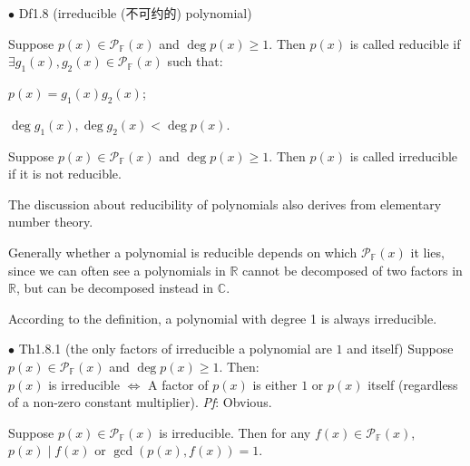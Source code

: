 \documentclass{article}
\begin{document}
\begin{Df}{$\bullet$ Df1.8 (irreducible (不可约的) polynomial)}
    \begin{compactitem}
        \item Suppose $p(x)\in\mathcal{P}_\mathbb{F}(x)$ and $\deg p(x)\geq 1$. Then $p(x)$ is called reducible if $\exists g_1(x), g_2(x)\in\mathcal{P}_\mathbb{F}(x)$ such that:
        \begin{compactenum}
            \item $p(x) = g_1(x)g_2(x)$;
            \item $\deg g_1(x), \deg g_2(x) < \deg p(x)$.
        \end{compactenum}
        \item Suppose $p(x)\in\mathcal{P}_\mathbb{F}(x)$ and $\deg p(x)\geq 1$. Then $p(x)$ is called irreducible if it is not reducible.
    \end{compactitem}
\end{Df}

\begin{Rmk}{}
    \begin{compactenum}
        \item The discussion about reducibility of polynomials also derives from elementary number theory.
        \item Generally whether a polynomial is reducible depends on which $\mathcal{P}_\mathbb{F}(x)$ it lies, since we can often see a polynomials in $\mathbb{R}$ cannot be decomposed of two factors in $\mathbb{R}$, but can be decomposed instead in $\mathbb{C}$.
        \item \textcolor{Th}{According to the definition, a polynomial with degree 1 is always irreducible.}
    \end{compactenum}
\end{Rmk}

\begin{Th}{$\bullet$ Th1.8.1 (the only factors of irreducible a polynomial are $1$ and itself)}
    Suppose $p(x)\in\mathcal{P}_\mathbb{F}(x)$ and $\deg p(x)\geq 1$. Then:\\
    $p(x)$ is irreducible $\Leftrightarrow$ A factor of $p(x)$ is either $1$ or $p(x)$ itself (regardless of a non-zero constant multiplier).
    \tcblower
    \textit{Pf}: Obvious.
\end{Th}

\begin{Rmk}{}
    \begin{compactenum}
        \item \textcolor{Th}{Suppose $p(x)\in\mathcal{P}_\mathbb{F}(x)$ is irreducible. Then for any $f(x)\in\mathcal{P}_\mathbb{F}(x)$, $p(x)\mid f(x)$ or $\gcd(p(x), f(x)) = 1$.}
    \end{compactenum}
\end{Rmk}
\end{document}
